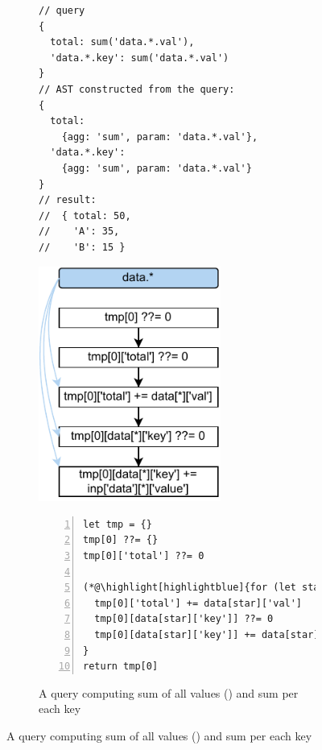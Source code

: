 \documentclass[runningheads]{llncs}
\begin{document}
\begin{figure}[t!]
\begin{subfigure}{\textwidth}
\begin{minipage}{0.3\textwidth}
\begin{lstlisting}[style=JavaScriptTiny, columns=flexible]
// query
{
  total: sum('data.*.val'),
  'data.*.key': sum('data.*.val')
}
// AST constructed from the query:
{
  total:
    {agg: 'sum', param: 'data.*.val'},
  'data.*.key':
    {agg: 'sum', param: 'data.*.val'}
}
// result:
//  { total: 50, 
//    'A': 35,
//    'B': 15 }
\end{lstlisting}
\end{minipage}
\begin{minipage}{0.3\textwidth}
\hspace{3.6mm}
\includegraphics[width=0.657\textwidth]{images/intro_q2_ir.pdf}
\end{minipage}
\begin{minipage}{0.38\textwidth}
\begin{lstlisting}[style=JavaScriptTiny, columns=flexible, numbers=left, xleftmargin=2pt]
let tmp = {}
tmp[0] ??= {}
tmp[0]['total'] ??= 0

(*@\highlight[highlightblue]{for (let star in data) }@*) {
  tmp[0]['total'] += data[star]['val']
  tmp[0][data[star]['key']] ??= 0
  tmp[0][data[star]['key']] += data[star]['val']
}
return tmp[0]
\end{lstlisting}
\end{minipage}
\vspace{-4mm}
\caption{A query computing sum of all values
() and sum per each key}\label{fig:intro_q2}
\end{subfigure}


\end{figure}
\end{document}
